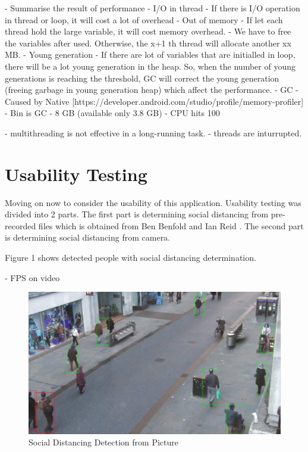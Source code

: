    - Summarise the result of performance
        - I/O in thread
            - If there is I/O operation in thread or loop, it will cost a lot of overhead
        - Out of memory
            - If let each thread hold the large variable, it will cost memory overhead.
            - We have to free the variables after used. Otherwise, the x+1 th thread will allocate another xx MB.
        - Young generation
            - If there are lot of variables that are initialled in loop, there will be a lot young generation in the heap. So, when the number of young generations is reaching the threshold, GC will correct the young generation (freeing garbage in young generation heap) which affect the performance.
        - GC
            - Caused by Native [https://developer.android.com/studio/profile/memory-profiler]
            - Bin is GC
            - 8 GB (available only 3.8 GB)
        - CPU hits 100%

        - multithreading is not effective in a long-running task.
            - threads are inturrupted.

    \section{Usability Testing}
        Moving on now to consider the usability of this application.
        Usability testing was divided into 2 parts.
        The first part is determining social distancing from pre-recorded files which is obtained from Ben Benfold and Ian Reid \cite{benfold2009attention}.
        The second part is determining social distancing from camera.

        Figure 1 shows detected people with social distancing determination.

        - FPS on video
        \begin{figure}[!ht]
            \includegraphics[width=6in]{images/chapter5/application/picture-detection.jpg}
            \caption{Social Distancing Detection from Picture}
            \label{result:picture}
        \end{figure}


